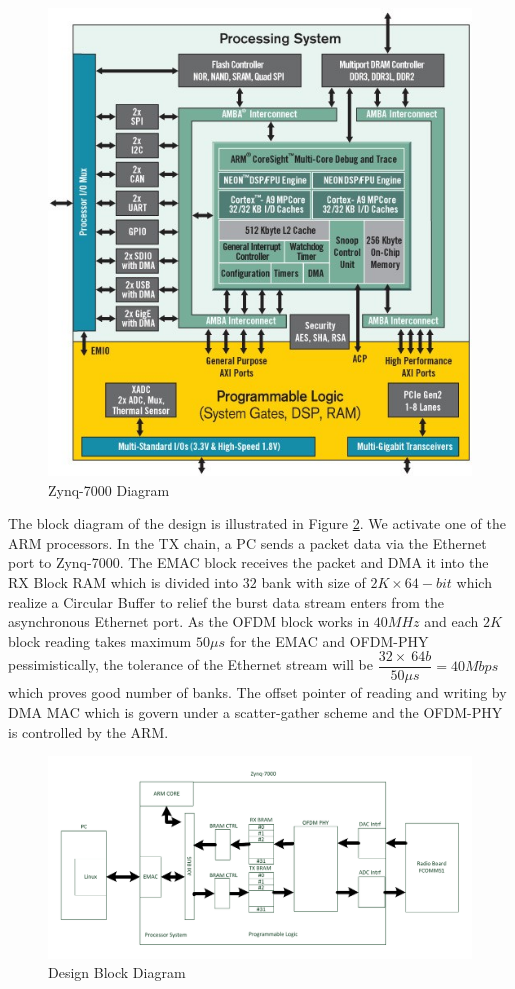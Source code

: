 \begin{figure}
\centering
\includegraphics[width=12cm]{content/fig/zynq_inside.JPG}
\caption{Zynq-7000 Diagram}
\label{fig:zynq_inside}
\end{figure}

The block diagram of the design is illustrated in Figure \ref{fig:design_block_diagram}. We activate one of the ARM processors. In the TX chain, a PC sends a packet data via the Ethernet port to Zynq-7000. The EMAC block receives the packet and DMA it into the RX Block RAM which is divided into $32$ bank with size of $2K \times 64-bit$ which realize a Circular Buffer to relief the burst data stream enters from the asynchronous Ethernet port. As the OFDM block works in $40 MHz$ and each $2K$ block reading takes maximum $50\mu s$ for the EMAC and OFDM-PHY pessimistically, the tolerance of the Ethernet stream will be $\dfrac{32 \times \ 64b}{50\mu s} = 40Mbps$ which proves good number of banks. The offset pointer of reading and writing by DMA MAC which is govern under a scatter-gather scheme and the OFDM-PHY is controlled by the ARM.\\

\begin{figure}
\centering
\includegraphics[width=\textwidth]{content/fig/sys_block_diagram.pdf}
\caption{Design Block Diagram}
\label{fig:design_block_diagram}
\end{figure}

